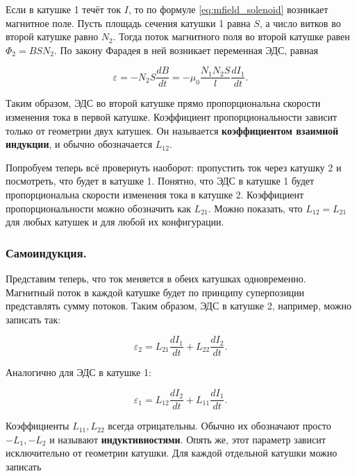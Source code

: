 \documentclass[11pt,a4paper]{article}
\numberwithin{equation}{section}
\newcommand{\vareps}{\varepsilon}
\begin{document}
Если в катушке 1 течёт ток $I$, то по формуле
\eqref{eq:mfield_solenoid} возникает магнитное поле. Пусть площадь
сечения катушки 1 равна $S$, а число витков во второй катушке равно
$N_2$. Тогда поток магнитного поля во второй катушке равен $\Phi_2 = B
S N_2$. По закону Фарадея в ней возникает переменная ЭДС, равная

\begin{equation}
  \label{eq:induction_eds}
  \vareps = - N_2 S \frac{dB}{dt} = -\mu_0 \frac{N_1 N_2 S}{l} \frac{dI_1}{dt}.
\end{equation}

Таким образом, ЭДС во второй катушке прямо пропорциональна скорости
изменения тока в первой катушке. Коэффициент пропорциональности
зависит только от геометрии двух катушек. Он называется
\textbf{коэффициентом взаимной индукции}, и обычно обозначается
$L_{12}$.

Попробуем теперь всё провернуть наоборот: пропустить ток через катушку
2 и посмотреть, что будет в катушке 1. Понятно, что ЭДС в катушке 1
будет пропорциональна скорости изменения тока в катушке 2. Коэффициент
пропорциональности можно обозначить как $L_{21}$. Можно показать, что
$L_{12} = L_{21}$ для любых катушек и для любой их конфигурации. 

\subsubsection{Самоиндукция.}
\label{sec:self_induction}

Представим теперь, что ток меняется в обеих катушках
одновременно. Магнитный поток в каждой катушке будет по принципу
суперпозиции представлять сумму потоков. Таким образом, ЭДС в катушке
2, например, можно записать так: 

\begin{equation}
  \label{eq:self_induction_1}
  \vareps_2 = L_{21} \frac{dI_1}{dt} + L_{22} \frac{dI_2}{dt}.
\end{equation}

Аналогично для ЭДС в катушке 1:

\begin{equation}
  \label{eq:self_induction_2}
  \vareps_1 = L_{12} \frac{dI_2}{dt} + L_{11} \frac{dI_1}{dt}.
\end{equation}

Коэффициенты $L_{11},L_{22}$ всегда отрицательны. Обычно их обозначают
просто $-L_1,-L_2$ и называют \textbf{индуктивностями}. Опять же, этот
параметр зависит исключительно от геометрии катушки. Для каждой
отдельной катушки можно записать
\end{document}
